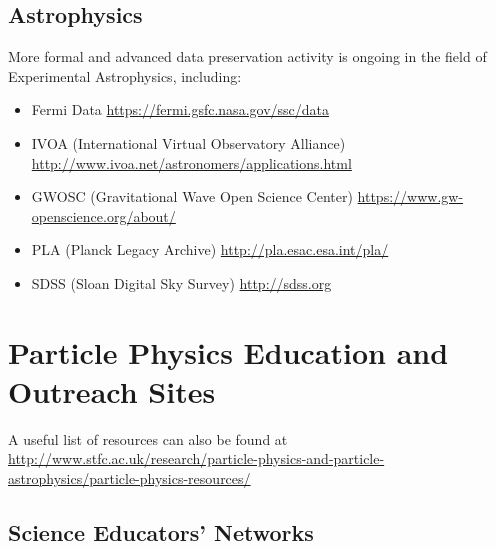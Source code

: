 \subsection{Astrophysics}\label{databases:subsec:presastrophys1}

More formal and advanced data preservation activity is ongoing in the
field of Experimental Astrophysics, including:

\begin{itemize}
\tightlist
\item
  Fermi Data \url{https://fermi.gsfc.nasa.gov/ssc/data}
\item
  IVOA (International Virtual Observatory Alliance)
  \url{http://www.ivoa.net/astronomers/applications.html}
\item
  GWOSC (Gravitational Wave Open Science Center)
  \url{https://www.gw-openscience.org/about/}
\item
  PLA (Planck Legacy Archive) \url{http://pla.esac.esa.int/pla/}
\item
  SDSS (Sloan Digital Sky Survey) \url{http://sdss.org}
\end{itemize}
\section{Particle Physics Education and Outreach
Sites}\label{databases:sec:edusites}

A useful list of resources can also be found at
\url{http://www.stfc.ac.uk/research/particle-physics-and-particle-astrophysics/particle-physics-resources/}

\subsection{Science Educators'
Networks}\label{databases:subsec:edusiteseducators}

